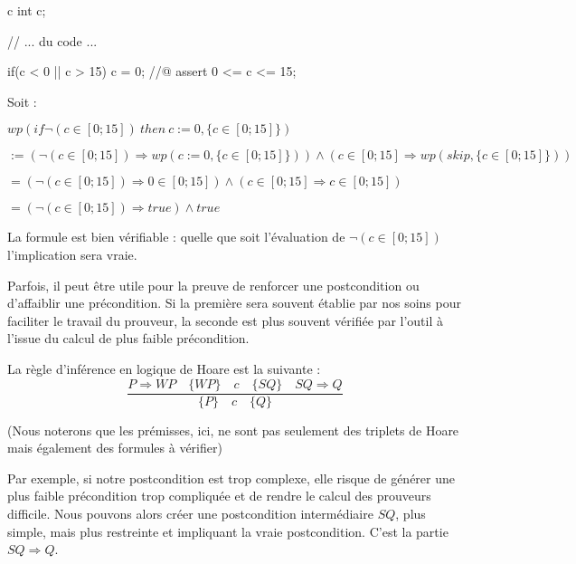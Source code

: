 \begin{CodeBlock}{c}
int c;

// ... du code ...

if(c < 0 || c > 15){
  c = 0;
}
//@ assert 0 <= c <= 15;
\end{CodeBlock}



Soit :



$wp(if \neg (c \in [0;15])\ then\ c := 0, \{c \in [0;15]\})$



$:= (\neg (c \in [0;15])\Rightarrow wp(c := 0, \{c \in [0;15]\})) \wedge (c \in [0;15]\Rightarrow wp(skip, \{c \in [0;15]\}))$



$= (\neg (c \in [0;15]) \Rightarrow 0 \in [0;15]) \wedge (c \in [0;15] \Rightarrow c \in [0;15])$



$= (\neg (c \in [0;15]) \Rightarrow true) \wedge true$



La formule est bien vérifiable : quelle que soit l'évaluation de $\neg (c \in [0;15])$ l'implication sera vraie.


\label{l3:statements-basic-consequence}



Parfois, il peut être utile pour la preuve de renforcer une postcondition ou
d'affaiblir une précondition. Si la première sera souvent établie par nos soins
pour faciliter le travail du prouveur, la seconde est plus souvent vérifiée
par l'outil à l'issue du calcul de plus faible précondition.



La règle d'inférence en logique de Hoare est la suivante :
$$\dfrac{P \Rightarrow WP \quad \{WP\}\quad c\quad \{SQ\} \quad SQ \Rightarrow Q}{\{P\}\quad c \quad \{Q\}}$$



(Nous noterons que les prémisses, ici, ne sont pas seulement des triplets de
Hoare mais également des formules à vérifier)



Par exemple, si notre postcondition est trop complexe, elle risque de générer
une plus faible précondition trop compliquée et de rendre le calcul des
prouveurs difficile. Nous pouvons alors créer une postcondition intermédiaire
$SQ$, plus simple, mais plus restreinte et impliquant la vraie postcondition.
C'est la partie $SQ \Rightarrow Q$.



